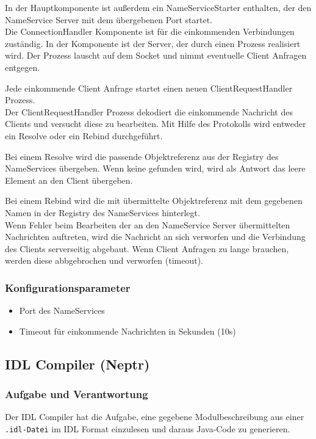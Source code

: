 \documentclass{article}
\begin{document}
In der Hauptkomponente ist außerdem ein NameServiceStarter enthalten, der den NameService Server mit dem übergebenen
Port startet.\\

Die ConnectionHandler Komponente ist für die einkommenden Verbindungen zuständig. In der Komponente ist der Server, der
durch einen Prozess realisiert wird. Der Prozess lauscht auf dem Socket und nimmt eventuelle Client Anfragen entgegen.

Jede einkommende Client Anfrage startet einen neuen ClientRequestHandler Prozess.\\

Der ClientRequestHandler Prozess dekodiert die einkommende Nachricht des Clients und versucht diese zu bearbeiten.
Mit Hilfe des Protokolls wird entweder ein Resolve oder ein Rebind durchgeführt.

Bei einem Resolve wird die passende Objektreferenz aus der Registry des NameServices übergeben. Wenn keine gefunden
wird, wird als Antwort das leere Element an den Client übergeben.

Bei einem Rebind wird die mit übermittelte Objektreferenz mit dem gegebenen Namen in der Registry des NameServices
hinterlegt.\\

Wenn Fehler beim Bearbeiten der an den NameService Server übermittelten Nachrichten auftreten, wird die Nachricht an
sich verworfen und die Verbindung des Clients serverseitig abgebaut. Wenn Client Anfragen zu lange brauchen, werden
diese abbgebrochen und verworfen (timeout).

\subsubsection{Konfigurationsparameter}
\begin{itemize}
    \item Port des NameServices
    \item Timeout für einkommende Nachrichten in Sekunden (10s)
\end{itemize}

\subsection{IDL Compiler (Neptr)}
\subsubsection{Aufgabe und Verantwortung}
Der IDL Compiler hat die Aufgabe, eine gegebene Modulbeschreibung aus einer \texttt{.idl-Datei} im IDL Format einzulesen
und daraus Java-Code zu generieren.\\
\end{document}
